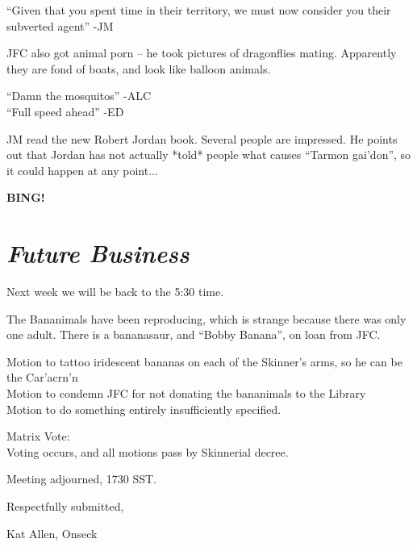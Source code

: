 \documentclass[10pt]{article}
\newcommand{\bing}{{\bf BING!} }
\newcommand{\goto}[1]{\bing \vskip 12pt \section*{{\em{#1}}}}
\begin{document}
``Given that you spent time in their territory, we must now consider
you their subverted agent'' -JM

JFC also got animal porn -- he took pictures of dragonflies
mating. Apparently they are fond of boats, and look like balloon animals.

``Damn the mosquitos'' -ALC\\
``Full speed ahead'' -ED

JM read the new Robert Jordan book. Several people are impressed.
He points out that Jordan has not actually *told* people what causes
``Tarmon gai'don'', so it could happen at any point...


\goto{Future Business}

Next week we will be back to the 5:30 time.

The Bananimals have been reproducing, which is strange because there
was only one adult.  There is a bananasaur, and ``Bobby Banana'', on
loan from JFC.

Motion to tattoo iridescent bananas on each of the Skinner's arms, so
he can be the Car'acrn'n\\
Motion to condemn JFC for not donating the bananimals to the Library\\
Motion to do something entirely insufficiently specified.

Matrix Vote:\\
Voting occurs, and all motions pass by Skinnerial decree.

\vspace{12pt}

\noindent
Meeting adjourned, 1730 SST.

\vspace{18pt}

\centerline{Respectfully submitted,}
\centerline{Kat Allen,  Onseck}
\end{document}
